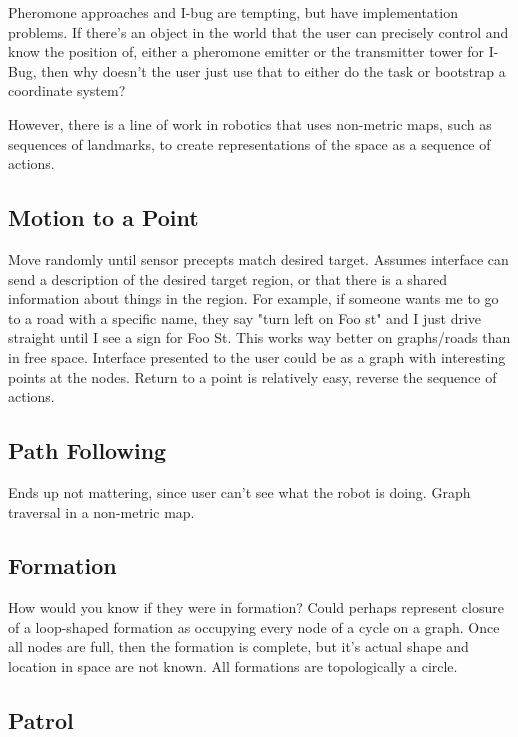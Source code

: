 Pheromone approaches and I-bug \cite{taylor2009bug} are tempting, but have implementation problems. If there's an object in the world that the user can precisely control and know the position of, either a pheromone emitter or the transmitter tower for I-Bug, then why doesn't the user just use that to either do the task or bootstrap a coordinate system? 

However, there is a line of work in robotics that uses non-metric maps, such as sequences of landmarks, to create representations of the space as a sequence of actions.  

\subsection{Motion to a Point}

Move randomly until sensor precepts match desired target. Assumes interface can send a description of the desired target region, or that there is a shared information about things in the region. For example, if someone wants me to go to a road with a specific name, they say "turn left on Foo st" and I just drive straight until I see a sign for Foo St. This works way better on graphs/roads than in free space. 
Interface presented to the user could be as a graph with interesting points at the nodes. Return to a point is relatively easy, reverse the sequence of actions. 

\subsection{Path Following}

Ends up not mattering, since user can't see what the robot is doing. Graph traversal in a non-metric map. 

\subsection{Formation}

How would you know if they were in formation? Could perhaps represent closure of a loop-shaped formation as occupying every node of a cycle on a graph. Once all nodes are full, then the formation is complete, but it's actual shape and location in space are not known. All formations are topologically a circle.

\subsection{Patrol}

